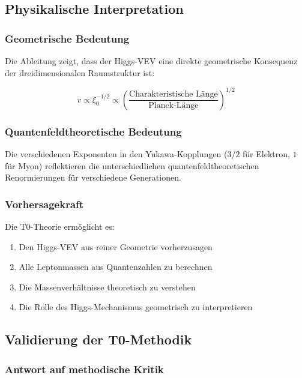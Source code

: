 \documentclass[12pt,a4paper]{article}
\begin{document}
\subsection{Physikalische Interpretation}

\subsubsection{Geometrische Bedeutung}

Die Ableitung zeigt, dass der Higgs-VEV eine direkte geometrische Konsequenz der dreidimensionalen Raumstruktur ist:

\begin{equation}
	v \propto \xi_0^{-1/2} \propto \left(\frac{\text{Charakteristische Länge}}{\text{Planck-Länge}}\right)^{1/2}
\end{equation}

\subsubsection{Quantenfeldtheoretische Bedeutung}

Die verschiedenen Exponenten in den Yukawa-Kopplungen ($3/2$ für Elektron, $1$ für Myon) reflektieren die unterschiedlichen quantenfeldtheoretischen Renormierungen für verschiedene Generationen.

\subsubsection{Vorhersagekraft}

Die T0-Theorie ermöglicht es:

\begin{enumerate}
	\item Den Higgs-VEV aus reiner Geometrie vorherzusagen
	\item Alle Leptonmassen aus Quantenzahlen zu berechnen
	\item Die Massenverhältnisse theoretisch zu verstehen
	\item Die Rolle des Higgs-Mechanismus geometrisch zu interpretieren
\end{enumerate}

\subsection{Validierung der T0-Methodik}

\subsubsection{Antwort auf methodische Kritik}
\end{document}
